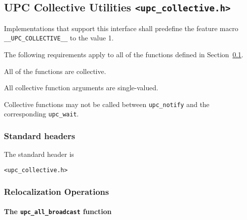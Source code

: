\subsection{UPC Collective Utilities {\tt <upc\_collective.h>}}
\label{upc-collective}

\npf Implementations that support this interface shall predefine the
    feature macro {\tt \_\_UPC\_COLLECTIVE\_\_} to the value 1.

\np The following requirements apply to all of the functions defined
in Section~\ref{upc-collective}.

\np All of the functions are collective.~%

\np All collective function arguments are single-valued.

\np Collective functions may not be called between {\tt upc\_notify}
and the corresponding {\tt upc\_wait}.

\subsubsection{Standard headers}

\np The standard header is

{\tt <upc\_collective.h>}

\np {}

\np {}

\subsubsection{Relocalization Operations}

\paragraph{The {\tt upc\_all\_broadcast} function}

